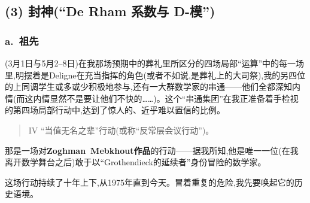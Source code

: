 \subsection{(3) 封神(“De Rham 系数与 D-模”)}



\subsubsection*{a.~祖先}



(3月1日与5月2--8日)在我那场预期中的葬礼里所区分的四场局部“运算”中的每一场里,明摆着是Deligne在充当指挥的角色(或者不如说,是葬礼上的大司祭\dmark{}),我的另四位的上同调学生或多或少积极地参与,还有一大群数学家的串通——他们全都深知内情(而这内情显然不是要让他们不快的……)。这个“串通集团”在我正准备着手检视的第四场局部行动中,达到了惊人的、近乎难以置信的比例。

\begin{quote}
IV “当值无名之辈”行动(或称“反常层会议行动”)。
\end{quote}

那是一场对\textbf{Zoghman~Mebkhout作品}的行动——据我所知,他是唯一一位(在我离开数学舞台之后)敢于以“Grothendieck的延续者”身份冒险的数学家。

这场行动持续了十年上下,从1975年直到今天。冒着重复的危险,我先要唤起它的历史语境。

